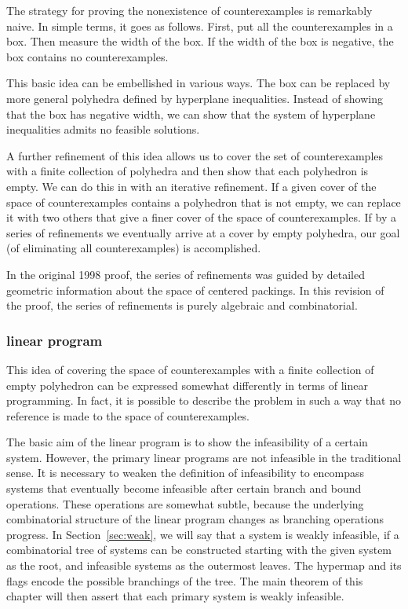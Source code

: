 The strategy for proving the nonexistence of counterexamples is
remarkably naive. In simple terms, it goes as follows.  First, put
all the counterexamples in a box. Then measure the width of the
box. If the width of the box is negative, the box contains no
counterexamples.

This basic idea can be embellished in various ways.  The box can
be replaced by more general polyhedra defined by hyperplane
inequalities.  Instead of showing that the box has negative width,
we can show that the system of hyperplane inequalities admits no
feasible solutions.

A further refinement of this idea allows us to cover the set of
counterexamples with a finite collection of polyhedra and then
show that each polyhedron is empty.  We can do this in with an
iterative refinement.  If a given cover of the space of
counterexamples contains a polyhedron that is not empty, we can
replace it with two others that give a finer cover of the space of
counterexamples.  If by a series of  refinements we eventually
arrive at a cover by empty polyhedra, our goal (of eliminating all
counterexamples) is accomplished.

In the original 1998 proof, the series of refinements was guided
by detailed geometric information about the space of centered
packings.  In this revision of the proof, the series of
refinements is purely algebraic and combinatorial.

\subsubsection{linear program}

This idea of covering the space of counterexamples with a finite
collection of empty polyhedron can be expressed somewhat
differently in terms of linear programming.  In fact, it is
possible to describe the problem in such a way that no reference
is made to the space of counterexamples.

The basic aim of the linear program is to show the infeasibility
of a certain system.  However, the primary linear programs are not
infeasible in the traditional sense.  It is necessary to weaken
the definition of infeasibility to encompass systems that
eventually become infeasible after certain branch and bound
operations.  These operations are somewhat subtle, because the
underlying combinatorial structure of the linear program changes
as branching operations progress.   In Section~\ref{sec:weak}, we
will say that a system is weakly infeasible, if a combinatorial
tree of systems can be constructed starting with the given system
as the root, and infeasible systems as the outermost leaves.  The
hypermap and its flags encode the possible branchings of the tree.
The main theorem of this chapter will then assert that each
primary system is weakly infeasible.

